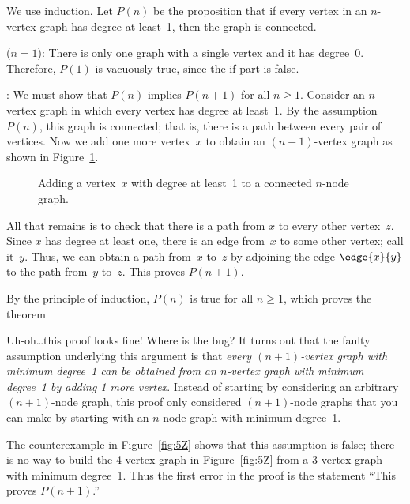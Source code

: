 \begin{bogusproof}
We use induction.  Let $P(n)$ be the proposition that if every vertex
in an $n$-vertex graph has degree at least~1, then the graph is
connected.

 ($n=1$): There is only one graph with a
single vertex and it has degree~0.  Therefore, $P(1)$ is vacuously true,
since the if-part is false.

: We must show that $P(n)$ implies
$P(n+1)$ for all $n \ge 1$.  Consider an $n$-vertex graph in which
every vertex has degree at least~1.  By the assumption~$P(n)$, this
graph is connected; that is, there is a path between every pair of
vertices.  Now we add one more vertex~$x$ to obtain an $(n+1)$-vertex
graph as shown in Figure~\ref{fig:5Y}.

\begin{figure}


\caption{Adding a vertex~$x$ with degree at least~1 to a connected
  $n$-node graph.}

\label{fig:5Y}

\end{figure}

All that remains is to check that there is a path from $x$ to every
other vertex~$z$.  Since $x$ has degree at least one, there is an edge
from~$x$ to some other vertex; call it~$y$.  Thus, we can obtain a
path from~$x$ to~$z$ by adjoining the edge $\edge{x}{y}$ to the path
from~$y$ to~$z$.  This proves $P(n + 1)$.

By the principle of induction, $P(n)$ is true for all  $n \ge 1$,
which proves the theorem
\end{bogusproof}

Uh-oh\dots this proof looks fine!  Where is the bug?  It turns out
that the faulty assumption underlying this argument is that
\emph{every $(n + 1)$-vertex graph with minimum degree~1 can be
obtained from an $n$-vertex graph with minimum degree~1 by adding 1
more vertex}.  Instead of starting by considering an arbitrary $(n +
1)$-node graph, this proof only considered $(n + 1)$-node graphs
that you can make by starting with an $n$-node graph with minimum
degree~1.

The counterexample in Figure~\ref{fig:5Z} shows that this assumption
is false; there is no way to build the 4-vertex graph in
Figure~\ref{fig:5Z} from a 3-vertex graph with minimum degree~1.
Thus the first error in the proof is the statement ``This proves
$P(n + 1)$.''

